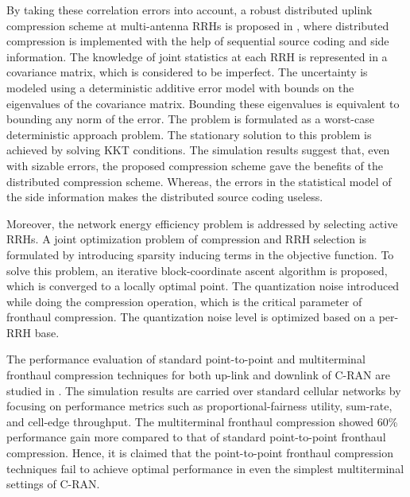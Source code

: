 \begin{multicols}{2}
\begin{itemize}
By taking these correlation errors into account, a robust distributed uplink compression scheme at multi-antenna RRHs is proposed in \cite{art3-key51}, where distributed compression is implemented with the help of sequential source coding and side information. The knowledge of joint statistics at each RRH is represented in a covariance matrix, which is considered to be imperfect. The uncertainty is modeled using a deterministic additive error model with bounds on the eigenvalues of the covariance matrix. Bounding these eigenvalues is equivalent to bounding any norm of the error. The problem is formulated as a worst-case deterministic approach problem. The stationary solution to this problem is achieved by solving KKT conditions. The simulation results suggest that, even with sizable errors, the proposed compression scheme gave the benefits of  the distributed compression scheme. Whereas, the errors in the
statistical model of the side information makes the distributed source coding useless.

Moreover, the network energy efficiency problem is addressed by selecting active RRHs. A joint optimization problem of compression and RRH selection is formulated by introducing sparsity inducing terms in the objective function. To solve this problem, an iterative block-coordinate ascent algorithm is proposed, which is converged to a locally optimal point. The quantization noise introduced while doing the compression operation, which is the critical parameter of fronthaul compression. The quantization noise level is optimized based on a per-RRH base.

The performance evaluation of standard point-to-point and multiterminal fronthaul compression techniques for both up-link and downlink of C-RAN are studied in \cite{art3-key52}. The simulation results are carried over standard cellular networks by focusing on performance metrics such as proportional-fairness utility, sum-rate, and cell-edge throughput. The multiterminal fronthaul compression showed 60\% performance gain more compared to that of standard point-to-point fronthaul compression. Hence, it is claimed that the point-to-point fronthaul compression techniques fail to achieve optimal performance in even the simplest multiterminal settings of C-RAN.


\end{itemize}
\end{multicols}
